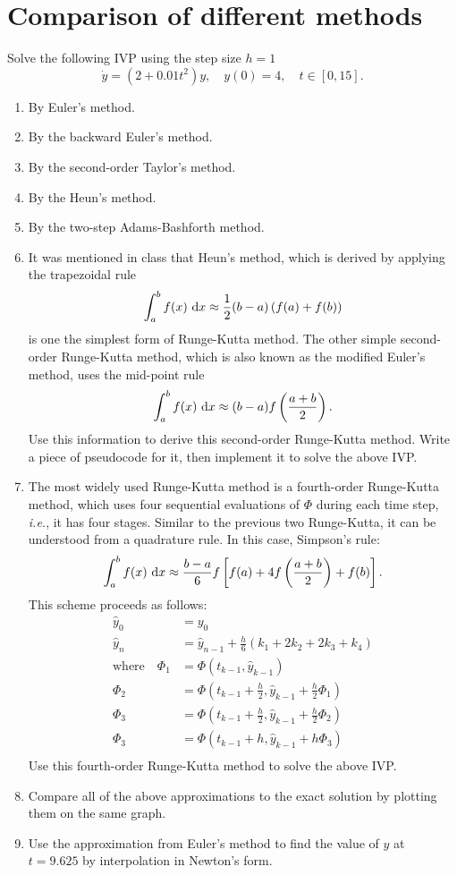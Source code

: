 \section{Comparison of different methods}
Solve the following IVP using the step size \(h = 1\)
\[ \dot{y}=\left(2+0.01t^2\right)y, \quad y(0)=4, \quad t\in[0,15]. \]
\begin{enumerate}
	\item By Euler's method.
	\item By the backward Euler's method.
	\item By the second-order Taylor's method.
	\item By the Heun's method.
	\item By the two-step Adams-Bashforth method.
	\item It was mentioned in class that Heun's method, which is derived by applying the trapezoidal rule
	\[ \int_{a}^{b}f(x)~\mathrm{d} x\approx\frac{1}{2}(b-a)\left(f(a)+f(b)\right) \]
	is one the simplest form of Runge-Kutta method.
	The other simple second-order Runge-Kutta method, which is also known as the modified Euler's method, uses the mid-point rule
	\[ \int_{a}^{b}f(x)~\mathrm{d} x\approx(b-a)f\left(\frac{a+b}{2}\right). \]
	Use this information to derive this second-order Runge-Kutta method.
	Write a piece of pseudocode for it, then implement it to solve the above IVP.
	\item The most widely used Runge-Kutta method is a fourth-order Runge-Kutta method, which uses four sequential evaluations of \(\Phi\) during each time step, \textit{i.e.}, it has four stages.
	Similar to the previous two Runge-Kutta, it can be understood from a quadrature rule.
	In this case, Simpson's rule:
	\[ \int_{a}^{b}f(x)~\mathrm{d} x\approx\frac{b-a}{6}f\left[f(a)+4f\left(\frac{a+b}{2}\right)+f(b)\right]. \]
	This scheme proceeds as follows:
	\begin{align*}
	\hat{y}_0&=y_0\\
	\hat{y}_n&=\hat{y}_{n-1}+\frac{h}{6}(k_1+2k_2+2k_3+k_4)\\
	\text{where} \quad \Phi_1&=\Phi(t_{k-1},\hat{y}_{k-1})\\
	\Phi_2&=\Phi\left(t_{k-1}+\frac{h}{2},\hat{y}_{k-1}+\frac{h}{2}\Phi_1\right)\\
	\Phi_3&=\Phi\left(t_{k-1}+\frac{h}{2},\hat{y}_{k-1}+\frac{h}{2}\Phi_2\right)\\
	\Phi_3&=\Phi\left(t_{k-1}+h,\hat{y}_{k-1}+h\Phi_3\right)\\
	\end{align*}
	Use this fourth-order Runge-Kutta method to solve the above IVP.
	\item Compare all of the above approximations to the exact solution by plotting them on the same graph.
	\item Use the approximation from Euler's method to find the value of \(y\) at \(t=9.625\) by interpolation in Newton's form.
\end{enumerate}


